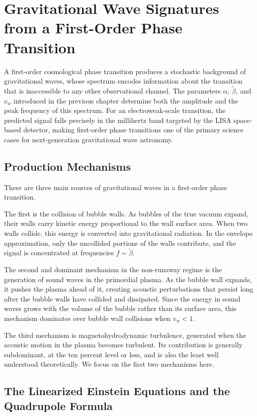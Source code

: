 \chapter{Gravitational Wave Signatures from a First-Order Phase Transition}
\label{ch:gw-signatures}

A first-order cosmological phase transition produces a stochastic
background of gravitational waves, whose spectrum encodes information
about the transition that is inaccessible to any other observational
channel. The parameters $\alpha$, $\tilde\beta$, and $v_w$ introduced
in the previous chapter determine both the amplitude and the peak
frequency of this spectrum. For an electroweak-scale transition, the
predicted signal falls precisely in the millihertz band targeted by
the LISA space-based detector, making first-order phase transitions
one of the primary science cases for next-generation gravitational
wave astronomy.

\section{Production Mechanisms}

There are three main sources of gravitational waves in a first-order
phase transition.

The first is the collision of bubble walls. As bubbles of the true
vacuum expand, their walls carry kinetic energy proportional to the
wall surface area. When two walls collide, this energy is converted
into gravitational radiation. In the envelope approximation, only the
uncollided portions of the walls contribute, and the signal is
concentrated at frequencies $f \sim \tilde\beta$.

The second and dominant mechanism in the non-runaway regime is the
generation of sound waves in the primordial plasma. As the bubble wall
expands, it pushes the plasma ahead of it, creating acoustic
perturbations that persist long after the bubble walls have collided
and dissipated. Since the energy in sound waves grows with the volume
of the bubble rather than its surface area, this mechanism dominates
over bubble wall collisions when $v_w < 1$.

The third mechanism is magnetohydrodynamic turbulence, generated when
the acoustic motion in the plasma becomes turbulent. Its contribution
is generally subdominant, at the ten percent level or less, and is
also the least well understood theoretically. We focus on the first
two mechanisms here.

\section{The Linearized Einstein Equations and the Quadrupole Formula}


